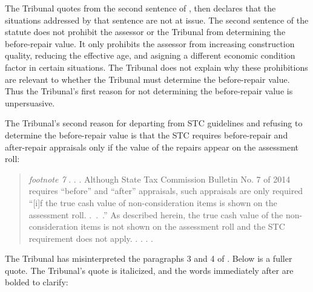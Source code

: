 \documentclass[12pt,\documentclassflag]{michiganCourtOfAppealsBrief}
\begin{document}
The Tribunal quotes from the second sentence of \mathieuGast, then declares that the situations addressed by that sentence are not at issue. The second sentence of the statute does not prohibit the assessor or the Tribunal from determining the before-repair value. It only prohibits the assessor from increasing construction quality, reducing the effective age, and asigning a different economic condition factor in certain situations. 
The Tribunal does not explain why these prohibitions are relevant to whether the Tribunal must determine the before-repair value.
Thus the Tribunal's first reason for not determining the before-repair value is unpersuasive. %

The Tribunal's second reason for departing from STC guidelines and refusing to determine the before-repair value is that the STC requires before-repair and after-repair appraisals only if the value of the repairs appear on the assessment roll:

\begin{quote}
  {\em footnote 7} . . .  Although State Tax Commission Bulletin No. 7 of 2014 requires ``before'' and ``after'' appraisals, such appraisals are only required ``[i]f the true cash value of non-consideration items is shown on the assessment roll. .~.~.'' As described herein, the true cash value of the non-consideration items is not shown on the assessment roll and the STC requirement does not apply. . . . \reconsiderationDenied[2].
\end{quote}

The Tribunal has misinterpreted the paragraphs 3 and 4 of . Below is a fuller quote. The Tribunal's quote is italicized, and the words immediately after are bolded to clarify:
\end{document}
